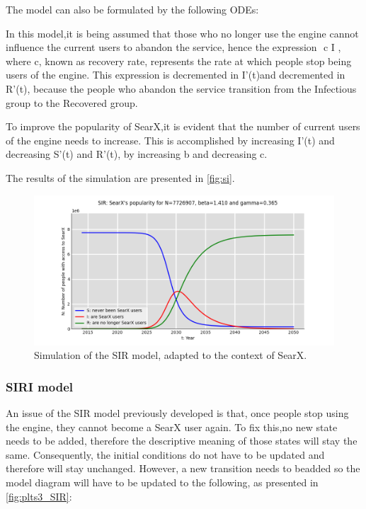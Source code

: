 \documentclass{article}
\begin{document}
The‌ ‌model‌ ‌can‌ ‌also‌ ‌be‌ ‌formulated‌ ‌by‌ ‌the‌ ‌following‌ ‌ODEs‌:‌


In‌‌ this‌‌ model,‌‌it‌‌ is‌‌ being‌‌ assumed‌‌ that‌‌ those‌‌ who‌‌ no‌‌ longer‌‌ use‌‌ the‌‌ engine‌‌ cannot‌‌ influence‌‌ the‌‌ current‌ ‌users‌ ‌to‌ ‌abandon‌ ‌the‌ ‌service,‌ ‌hence‌ ‌the‌ ‌expression‌ ‌ c I ,‌ ‌where‌ ‌c,‌ ‌known‌ ‌as‌‌ recovery‌‌ rate,‌ ‌represents‌ ‌the‌ ‌rate‌ ‌at‌ ‌which‌ ‌people‌ ‌stop‌ ‌being‌ ‌users‌ ‌of‌ ‌the‌ ‌engine.‌ ‌This‌ ‌expression‌ ‌is‌‌ decremented‌ ‌in‌ ‌I'(t)‌‌and‌ ‌decremented‌ ‌in‌ ‌R'(t),‌ ‌because‌ ‌the‌ ‌people‌ ‌who‌ ‌abandon‌ ‌the‌ ‌service‌‌ transition‌ ‌from‌ ‌the‌ ‌Infectious‌ ‌group‌ ‌to‌ ‌the‌ ‌Recovered‌ ‌group.‌‌

To‌‌ improve ‌‌the ‌‌popularity ‌‌of‌‌ SearX,‌‌it ‌‌is ‌‌evident‌‌ that‌‌ the‌‌ number‌‌ of‌‌ current‌‌ users‌‌ of‌‌ the‌‌ engine‌‌ needs‌ ‌to‌ ‌increase.‌ ‌This‌ ‌is‌ ‌accomplished‌ ‌by‌ ‌increasing‌ ‌I'(t)‌ ‌and‌ ‌decreasing‌ ‌S'(t)‌ ‌and‌ ‌R'(t),‌ ‌by‌‌
increasing‌ ‌b‌ ‌and‌ ‌decreasing‌ ‌c.‌

The‌ ‌results‌ ‌of‌ ‌the‌ ‌simulation‌ ‌are‌ ‌presented‌ ‌in‌ \autoref{fig:si}.‌‌

\begin{figure}[h]
    \centering
    \includegraphics[width=0.8\linewidth]{plts3_SIR2}
    \caption{‌‌Simulation‌ ‌of‌ ‌the‌ ‌SIR‌ ‌model,‌ ‌adapted‌ ‌to‌ ‌the‌ ‌context‌ ‌of‌ ‌SearX.‌‌‌‌}
    \label{fig:plts3_SIR}
\end{figure}

\subsubsection{SIRI model}

An‌‌ issue‌‌ of‌‌ the‌‌ SIR‌‌ model‌‌ previously‌‌ developed‌‌ is‌‌ that,‌‌ once‌‌ people‌‌ stop‌‌ using‌‌ the‌‌ engine,‌‌ they‌‌ cannot‌‌ become‌‌ a‌‌ SearX‌‌ user‌‌ again.‌‌ To‌‌ fix‌‌ this,‌‌no‌‌ new‌‌ state‌‌ needs‌‌ to‌‌ be‌‌ added,‌‌ therefore‌‌ the‌‌ descriptive‌ ‌meaning‌ ‌of‌ ‌those‌ ‌states‌ ‌will‌ ‌stay‌ ‌the‌ ‌same. ‌‌Consequently,‌‌ the‌‌ initial‌‌ conditions‌‌ do‌‌ not‌‌ have‌‌ to‌‌ be‌‌ updated ‌‌and‌‌ therefore‌‌ will‌‌ stay‌‌ unchanged.‌‌ However,‌‌ a‌‌ new‌‌ transition‌‌ needs‌‌ to‌‌ be‌‌added ‌‌so‌‌ the‌‌ model‌‌ diagram‌‌ will‌‌ have‌‌ to‌‌ be‌‌ updated‌‌ to‌‌ the‌‌ following,‌‌ as‌‌ presented‌‌ in‌‌ \autoref{fig:plts3_SIR}:‌
\end{document}
